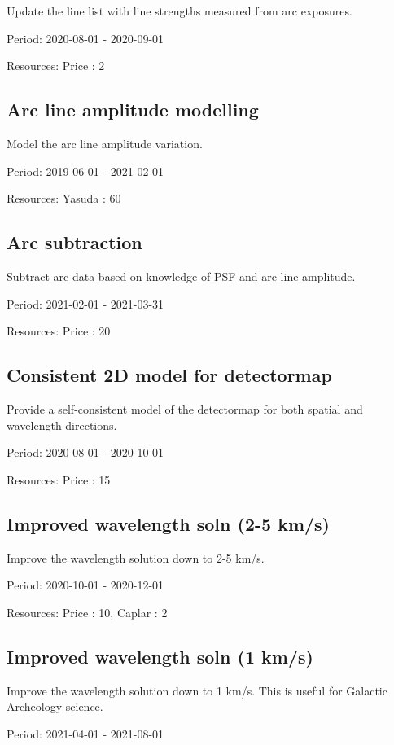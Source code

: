 Update the line list with line strengths measured from arc exposures.

Period: 2020-08-01 - 2020-09-01

Resources: Price : 2

\subsection{Arc line amplitude modelling}

Model the arc line amplitude variation.

Period: 2019-06-01 - 2021-02-01

Resources: Yasuda : 60

\subsection{Arc subtraction}

Subtract arc data based on knowledge of PSF and arc line amplitude.

Period: 2021-02-01 - 2021-03-31

Resources: Price : 20

\subsection{Consistent 2D model for detectormap}

Provide a self-consistent model of the detectormap for both spatial and wavelength directions.

Period: 2020-08-01 - 2020-10-01

Resources: Price : 15

\subsection{Improved wavelength soln (2-5 km/s)}

Improve the wavelength solution down to 2-5 km/s.

Period: 2020-10-01 - 2020-12-01

Resources: Price : 10, Caplar : 2

\subsection{Improved wavelength soln (1 km/s)}

Improve the wavelength solution down to 1 km/s. This is useful for Galactic Archeology science.

Period: 2021-04-01 - 2021-08-01

